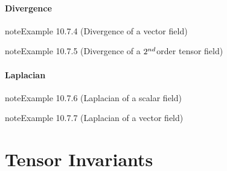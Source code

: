 \documentclass[letterpaper,10pt,english]{jupyterBook}
\begin{document}
\subsubsection{Divergence}
\label{\detokenize{ch/tensor-algebra-calculus/calculus-euclidean-spherical:divergence}}\label{\detokenize{ch/tensor-algebra-calculus/calculus-euclidean-spherical:tensor-calculus-spherical-differential-operators-divergence}}\label{ch/tensor-algebra-calculus/calculus-euclidean-spherical:example-3}
\begin{sphinxadmonition}{note}{Example 10.7.4 (Divergence of a vector field)}


\end{sphinxadmonition}
\label{ch/tensor-algebra-calculus/calculus-euclidean-spherical:example-4}
\begin{sphinxadmonition}{note}{Example 10.7.5 (Divergence of a \protect\(2^{nd}\protect\)\sphinxhyphen{}order tensor field)}


\end{sphinxadmonition}


\subsubsection{Laplacian}
\label{\detokenize{ch/tensor-algebra-calculus/calculus-euclidean-spherical:laplacian}}\label{\detokenize{ch/tensor-algebra-calculus/calculus-euclidean-spherical:tensor-calculus-spherical-differential-operators-laplacian}}\label{ch/tensor-algebra-calculus/calculus-euclidean-spherical:example-5}
\begin{sphinxadmonition}{note}{Example 10.7.6 (Laplacian of a scalar field)}


\end{sphinxadmonition}
\label{ch/tensor-algebra-calculus/calculus-euclidean-spherical:example-6}
\begin{sphinxadmonition}{note}{Example 10.7.7 (Laplacian of a vector field)}


\end{sphinxadmonition}

\sphinxstepscope


\chapter{Tensor Invariants}
\label{\detokenize{ch/tensor-algebra-calculus/tensor-invariants:tensor-invariants}}\label{\detokenize{ch/tensor-algebra-calculus/tensor-invariants:tensor-algebra-invariants}}\label{\detokenize{ch/tensor-algebra-calculus/tensor-invariants::doc}}
\end{document}
